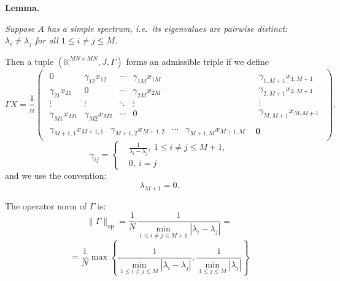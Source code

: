 \documentclass[a4paper]{jpconf}
\begin{document}
\begin{center}
\textbf{Lemma.}
{\it
Suppose \( A \) has a simple spectrum,
    i.e.\ its eigenvalues are pairwise distinct:
    \( \lambda_i\neq\lambda_j \) for all \( 1\leq i{\neq}j \leq M \).

    Then a tuple \( (\mathbb{K}^{{MN}{\times}{MN}}, J, \Gamma) \)
        forms an admissible triple if we define
    \[
        \Gamma X = 
            \frac1n \left(\begin{array}{c|c}
            \begin{matrix}
                0               & \gamma_{12}x_{12} & \cdots & \gamma_{1M}x_{1M} \\
                \gamma_{21}x_{21}  & 0              & \cdots & \gamma_{2M}x_{2M} \\
                \vdots          & \vdots         & \ddots & \vdots & \ \\
                \gamma_{M1}x_{M1}  & \gamma_{M2}x_{M2} & \cdots & 0
            \end{matrix} &
            \begin{matrix}
                \gamma_{1,M+1}x_{1,M+1} \\
                \gamma_{2,M+1}x_{2,M+1} \\
                \vdots \\
                \gamma_{M,M+1}x_{M,M+1}
            \end{matrix} \\ \hline
            \begin{matrix}
                \gamma_{M{+}1,1}x_{M{+}1,1} &
                \gamma_{M{+}1,2}x_{M{+}1,2} &
                \cdots &
                \gamma_{M{+}1,M}x_{M{+}1,M}
            \end{matrix} &
            \mathbf{0}
        \end{array}\right),
    \]
    \[
        \gamma_{ij} = \left\{
            \begin{aligned}
                & \frac{1}{\lambda_i - \lambda_j},\ 1\leq i{\neq}j \leq M{+}1,\\
                & 0,\ i=j
            \end{aligned}
            \right.
    \]
    and we use the convention:
    \[
        \lambda_{M{+}1} = 0.
    \]

    The operator norm of \( \Gamma \) is:
    \[
        \|\Gamma\|_{\mathrm{op}} =
        \frac1N
        \frac{1}{\min\limits_{1\leq i{\neq}j \leq M{+}1}|\lambda_i - \lambda_j|} =
        \]
    \[
        = \frac1N
         \max\left\{
         \frac{1}{
             \min\limits_{1\leq i{\neq}j \leq M }{|\lambda_i - \lambda_j|}},
         \frac{1}{
             \min\limits_{1\leq j \leq M}{|\lambda_j|}}
         \right\}
        \]
\/}
\end{center}
\end{document}
